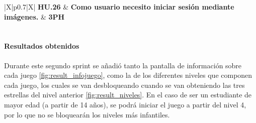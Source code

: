 \begin{table}[H]
\renewcommand{\arraystretch}{1.3}
\setlength{\tabcolsep}{10pt}
\vspace{0.8em}
\centering
\begin{tabularx}{\textwidth}{|X|p{}|X|}
    \hline
    \textbf{HU.26} & \textbf{Como usuario necesito iniciar sesión mediante imágenes.} & \textbf{3PH} \\
    \hline
     \\
    \hline
\end{tabularx}
\caption{HU.26 - Inicio de sesión mediante imágenes - Desglose de tareas}
\vspace{0.8em}
\end{table}

\newpage
\paragraph{Resultados obtenidos}
Durante este segundo sprint se añadió tanto la pantalla de información sobre cada juego \cref{fig:result_infojuego}, como la de los diferentes niveles que componen cada juego, los cuales se van desbloqueando cuando se van obteniendo las tres estrellas del nivel anterior \cref{fig:result_niveles}.
En el caso de ser un estudiante de mayor edad (a partir de 14 años), se podrá iniciar el juego a partir del nivel 4, por lo que no se bloquearán los niveles más infantiles.

